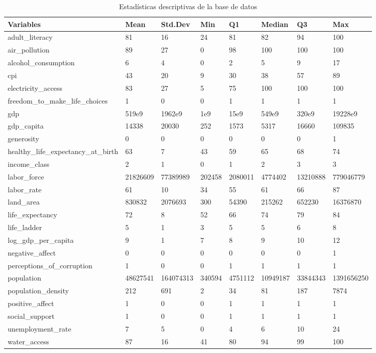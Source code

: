\begin{table}[!ht]
\caption{Estadísticas descriptivas de la base de datos}
\scriptsize
    \centering
    \begin{tabular}{|l|l|l|l|l|l|l|l|}
    \hline
         Variables & Mean & Std.Dev & Min & Q1 & Median & Q3 & Max \\ \hline
        adult\_literacy & 81 & 16 & 24 & 81 & 82 & 94 & 100 \\ \hline
        air\_pollution & 89 & 27 & 0 & 98 & 100 & 100 & 100 \\ \hline
        alcohol\_consumption & 6 & 4 & 0 & 2 & 5 & 9 & 17 \\ \hline
        cpi & 43 & 20 & 9 & 30 & 38 & 57 & 89 \\ \hline
        electricity\_access & 83 & 27 & 5 & 75 & 100 & 100 & 100 \\ \hline
        freedom\_to\_make\_life\_choices & 1 & 0 & 0 & 1 & 1 & 1 & 1 \\ \hline
        gdp & 519e9 & 1962e9 & 1e9 & 15e9 & 549e9 & 320e9 & 19228e9 \\ \hline
        gdp\_capita & 14338 & 20030 & 252 & 1573 & 5317 & 16660 & 109835 \\ \hline
        generosity & 0 & 0 & 0 & 0 & 0 & 0 & 1 \\ \hline
        healthy\_life\_expectancy\_at\_birth & 63 & 7 & 43 & 59 & 65 & 68 & 74 \\ \hline
        income\_class & 2 & 1 & 0 & 1 & 2 & 3 & 3 \\ \hline
        labor\_force & 21826609 & 77389989 & 202458 & 2080011 & 4774402 & 13210888 & 779046779 \\ \hline
        labor\_rate & 61 & 10 & 34 & 55 & 61 & 66 & 87 \\ \hline
        land\_area & 830832 & 2076693 & 300 & 54390 & 215262 & 652230 & 16376870 \\ \hline
        life\_expectancy & 72 & 8 & 52 & 66 & 74 & 79 & 84 \\ \hline
        life\_ladder & 5 & 1 & 3 & 5 & 5 & 6 & 8 \\ \hline
        log\_gdp\_per\_capita & 9 & 1 & 7 & 8 & 9 & 10 & 12 \\ \hline
        negative\_affect & 0 & 0 & 0 & 0 & 0 & 0 & 1 \\ \hline
        perceptions\_of\_corruption & 1 & 0 & 0 & 1 & 1 & 1 & 1 \\ \hline
        population & 48627541 & 164074313 & 340594 & 4751112 & 10949187 & 33844343 & 1391656250 \\ \hline
        population\_density & 212 & 691 & 2 & 34 & 81 & 187 & 7874 \\ \hline
        positive\_affect & 1 & 0 & 0 & 1 & 1 & 1 & 1 \\ \hline
        social\_support & 1 & 0 & 0 & 1 & 1 & 1 & 1 \\ \hline
        unemployment\_rate & 7 & 5 & 0 & 4 & 6 & 10 & 24 \\ \hline
        water\_access & 87 & 16 & 41 & 80 & 94 & 99 & 100 \\ \hline
    \end{tabular}
\end{table}

